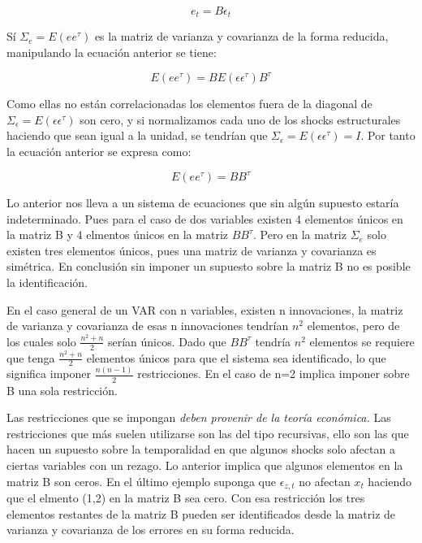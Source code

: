 \documentclass[
]{book}
\begin{document}
\begin{equation}
e_{t}=B\epsilon_{t}
\end{equation}

Sí \(\Sigma_e=E(ee^{\tau})\) es la matriz de varianza y covarianza de la forma reducida, manipulando la ecuación anterior se tiene:

\begin{equation}
E(ee^{\tau})=BE(\epsilon\epsilon^{\tau})B^{\tau}
\end{equation}

Como ellas no están correlacionadas los elementos fuera de la diagonal de
\(\Sigma_\epsilon=E(\epsilon\epsilon^{\tau})\) son cero, y si normalizamos cada uno de los shocks estructurales haciendo que sean igual a la unidad, se tendrían que \(\Sigma_\epsilon=E(\epsilon\epsilon^{\tau})=I\). Por tanto la ecuación anterior se expresa como:

\begin{equation}
E(ee^{\tau})=BB^{\tau}
\end{equation}

Lo anterior nos lleva a un sistema de ecuaciones que sin algún supuesto estaría indeterminado. Pues para el caso de dos variables existen 4 elementos únicos en la matriz B y 4 elmentos únicos en la matriz \(BB^{\tau}\). Pero en la matriz \(\Sigma_e\) solo existen tres elementos únicos, pues una matriz de varianza y covarianza es simétrica. En conclusión sin imponer un supuesto sobre la matriz B no es posible la identificación.

En el caso general de un VAR con n variables, existen n innovaciones, la matriz de varianza y covarianza de esas n innovaciones tendrían \(n^{2}\) elementos, pero de los cuales solo \(\frac{n^{2}+n}{2}\) serían únicos. Dado que \(BB^{\tau}\) tendría \(n^{2}\) elementos se requiere que tenga \(\frac{n^{2}+n}{2}\) elementos únicos para que el sistema sea identificado, lo que significa imponer \(\frac{n(n-1)}{2}\) restricciones. En el caso de n=2 implica imponer sobre B una sola restricción.

Las restricciones que se impongan \emph{deben provenir de la teoría económica.} Las restricciones que más suelen utilizarse son las del tipo recursivas, ello son las que hacen un supuesto sobre la temporalidad en que algunos shocks solo afectan a ciertas variables con un rezago. Lo anterior implica que algunos elementos en la matriz B son ceros. En el último ejemplo suponga que \(\epsilon_{z,t}\) no afectan \(x_{t}\) haciendo que el elmento (1,2) en la matriz B sea cero. Con esa restricción los tres elementos restantes de la matriz B pueden ser identificados desde la matriz de varianza y covarianza de los errores en su forma reducida.
\end{document}
